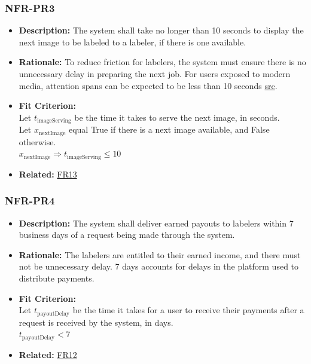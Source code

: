 \documentclass[12pt]{article}
\begin{document}
\subsubsection*{NFR-PR3}
\label{sec:PR3}
\begin{itemize}
  \item \textbf{Description:} The system shall take no longer than 10 seconds to display the next image to be labeled to a labeler, if there is one available.
  \item \textbf{Rationale:} To reduce friction for labelers, the system must ensure there is no unnecessary delay in preparing the next job. For users exposed to modern media, attention spans can be expected to be less than 10 seconds \href{https://profiletree.com/attention-span-crisis-digital-age-statistics/#:~:text=Studies%20have%20proven%20that%20being,focus%20after%208%20mere%20seconds}{src}.
  \item \textbf{Fit Criterion:}\\ Let $t_{\text{imageServing}}$ be the time it takes to serve the next image, in seconds.\\
  Let $x_{\text{nextImage}}$ equal True if there is a next image available, and False otherwise.\\
  $x_{\text{nextImage}} \Rightarrow t_{\text{imageServing}} \leq 10$
  \item \textbf{Related:} \hyperref[sec:FR13]{FR13}
\end{itemize}

\subsubsection*{NFR-PR4}
\label{sec:PR4}
\begin{itemize}
  \item \textbf{Description:} The system shall deliver earned payouts to labelers within 7 business days of a request being made through the system.
  \item \textbf{Rationale:} The labelers are entitled to their earned income, and there must not be unnecessary delay. 7 days accounts for delays in the platform used to distribute payments.
  \item \textbf{Fit Criterion:}\\ Let $t_{\text{payoutDelay}}$ be the time it takes for a user to receive their payments after a request is received by the system, in days.\\
  $t_{\text{payoutDelay}} < 7$
  \item \textbf{Related:} \hyperref[sec:FR12]{FR12}
\end{itemize}
\end{document}
